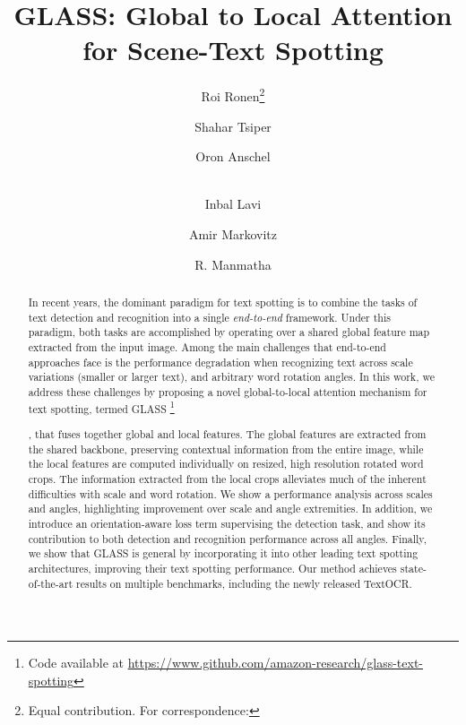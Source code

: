 \documentclass[runningheads]{llncs}
\newcommand\blfootnote[1]{\begingroup
  \renewcommand\thefootnote{}\footnote{#1}\addtocounter{footnote}{-1}\endgroup
}
\begin{document}
\pagestyle{headings}
\mainmatter
\def\ECCVSubNumber{1384}  

\title{GLASS: Global to Local Attention for Scene-Text Spotting} 



\author{Roi Ronen\thanks{Equal contribution. For correspondence: } \and 
Shahar Tsiper \and
Oron Anschel  \and  \\
Inbal Lavi \and 
Amir Markovitz \and
R. Manmatha}
\maketitle







\begin{abstract}





In recent years, the dominant paradigm for text spotting is to combine the tasks of text detection and recognition into a single \emph{end-to-end} framework. 
Under this paradigm, both tasks are accomplished by operating over a shared global feature map extracted from the input image.
Among the main challenges that end-to-end approaches face is the performance degradation when recognizing text across scale variations (smaller or larger text), and arbitrary word rotation angles.
In this work, we address these challenges by proposing a novel global-to-local attention mechanism for text spotting, termed GLASS\blfootnote{Code available at \href{https://www.github.com/amazon-research/glass-text-spotting}{{https://www.github.com/amazon-research/glass-text-spotting}}}, that fuses together global and local features.
The global features are extracted from the shared backbone, preserving contextual information from the entire image, while the local features are computed individually on resized, high resolution rotated word crops. 
The information extracted from the local crops alleviates much of the inherent difficulties with scale and word rotation.
We show a performance analysis across scales and angles, highlighting improvement over scale and angle extremities.
In addition, we introduce an orientation-aware loss term supervising the detection task, and show its contribution to both detection and recognition performance across all angles.
Finally, we show that GLASS is general by incorporating  it into other leading text spotting architectures, improving their text spotting performance.
Our method achieves state-of-the-art results on multiple benchmarks, including the newly released TextOCR.


\end{abstract}
\end{document}
